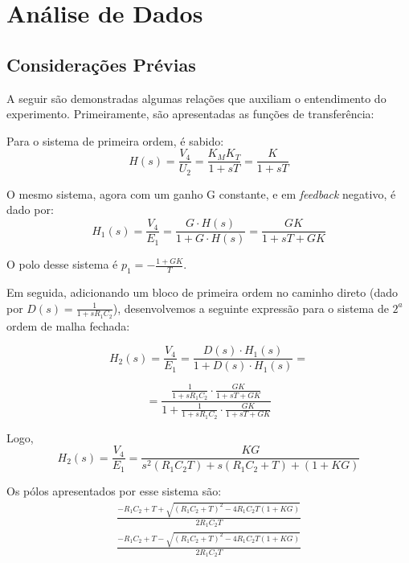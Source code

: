 \section{Análise de Dados}
\subsection{Considerações Prévias}
A seguir são demonstradas algumas relações que auxiliam o entendimento do experimento.
Primeiramente, são apresentadas as funções de transferência:

Para o sistema de primeira ordem, é sabido:
\begin{equation}
H(s)=\frac{V_4}{U_2}= \frac{K_MK_T}{1+sT}= \frac{K}{1+sT}
\end{equation}

O mesmo sistema, agora com um ganho G constante, e em \emph{feedback} negativo, é dado por:
\begin{equation}
H_1(s)=\frac{V_4}{E_1}=\frac{G\cdot H(s)}{1+G\cdot H(s)}=\frac{GK}{1+sT+GK}
\end{equation}

O polo desse sistema é $p_1=-\frac{1+GK}{T}$.

Em seguida, adicionando um bloco de primeira ordem no caminho direto (dado por $D(s)=\frac{1}{1+sR_1C_2}$), desenvolvemos a seguinte expressão para o sistema de $2^a$ ordem de malha fechada:

\begin{equation}
H_2(s)=\frac{V_4}{E_1}=\frac{D(s)\cdot H_1(s)}{1+D(s)\cdot H_1(s)}=
\end{equation}

\begin{equation}
=\frac{\frac{1}{1+sR_1C_2}\cdot \frac{GK}{1+sT+GK}}{1+\frac{1}{1+sR_1C_2}\cdot \frac{GK}{1+sT+GK}}
\end{equation}

Logo,
\begin{equation}
H_2(s)=\frac{V_4}{E_1}=\frac{KG}{s^2(R_1C_2T)+s(R_1C_2+T)+(1+KG)}
\end{equation}

Os pólos apresentados por esse sistema são:
\begin{equation}
\begin{array}{c}
 \frac{-R_1C_2+T+\sqrt{(R_1C_2+T)^2-4R_1C_2T(1+KG)}}{2R_1C_2T}  \\
 \frac{-R_1C_2+T-\sqrt{(R_1C_2+T)^2-4R_1C_2T(1+KG)}}{2R_1C_2T}
\end{array}
\end{equation}

